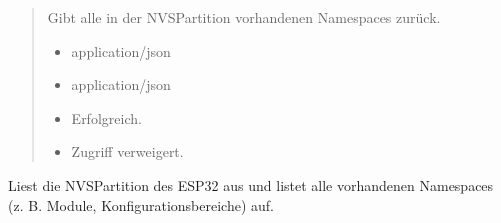 \documentclass[letterpaper,10pt,english]{sphinxmanual}
\begin{document}
\begin{fulllineitems}
\label{\detokenize{agv_rest_api_nve:get--api-nve-namespaces}}
\pysigstartsignatures
\pysigline
{}
\pysigstopsignatures\begin{quote}\begin{description}
\sphinxAtStartPar
Gibt alle in der NVS\sphinxhyphen{}Partition vorhandenen Namespaces zurück.

\begin{itemize}
\item {} 
\sphinxAtStartPar
{} \textendash{} application/json

\end{itemize}

\begin{itemize}
\item {} 
\sphinxAtStartPar
{} \textendash{} application/json

\end{itemize}

\begin{itemize}
\item {} 
\sphinxAtStartPar
{} \textendash{} Erfolgreich.

\item {} 
\sphinxAtStartPar
{} \textendash{} Zugriff verweigert.

\end{itemize}

\end{description}\end{quote}

\end{fulllineitems}


\sphinxAtStartPar
{}
Liest die NVS\sphinxhyphen{}Partition des ESP32 aus und listet alle vorhandenen Namespaces (z. B. Module, Konfigurationsbereiche) auf.

\sphinxAtStartPar
{}
\end{document}
